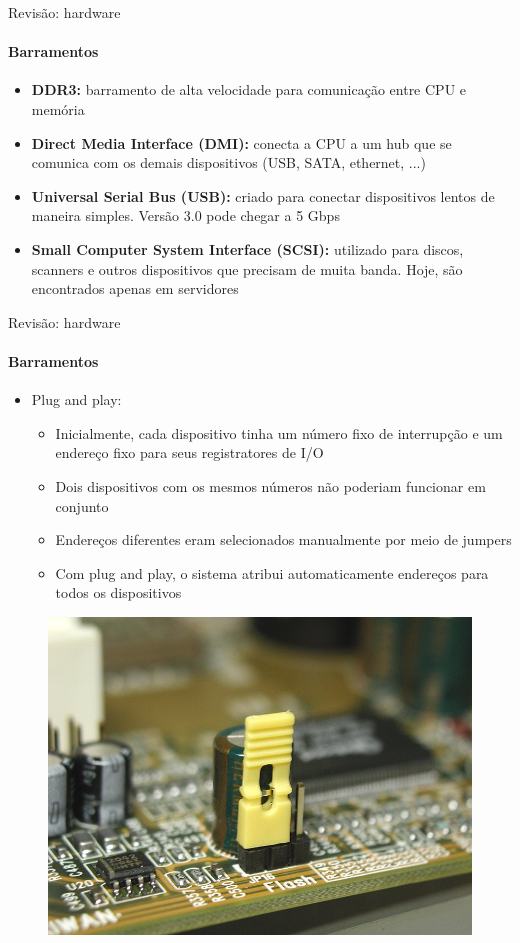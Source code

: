 \documentclass{beamer}
\begin{document}
\begin{frame}{Revisão: hardware}
	\framesubtitle{Barramentos}
	\begin{itemize}
		\item \textbf{DDR3:} barramento de alta velocidade para comunicação entre CPU e memória
		\item \textbf{Direct Media Interface (DMI):} conecta a CPU a um hub que se comunica com os demais dispositivos (USB, SATA, ethernet, ...)
		\item \textbf{Universal Serial Bus (USB):} criado para conectar dispositivos lentos de maneira simples. Versão 3.0 pode chegar a 5 Gbps
		\item \textbf{Small Computer System Interface (SCSI):} utilizado para discos, scanners e outros dispositivos que precisam de muita banda. Hoje, são encontrados apenas em servidores
	\end{itemize}
\end{frame}
\begin{frame}{Revisão: hardware}
	\framesubtitle{Barramentos}
	\begin{itemize}
		\item Plug and play:
		\begin{itemize}
			\item Inicialmente, cada dispositivo tinha um número fixo de interrupção e um endereço fixo para seus registratores de I/O
			\item Dois dispositivos com os mesmos números não poderiam funcionar em conjunto
			\item Endereços diferentes eram selecionados manualmente por meio de jumpers
			\item Com plug and play, o sistema atribui automaticamente endereços para todos os dispositivos
		\end{itemize}
	\end{itemize}
	\begin{figure}
		\includegraphics[width=0.25\paperwidth]{resources/jumper}
	\end{figure}
\end{frame}
\end{document}
